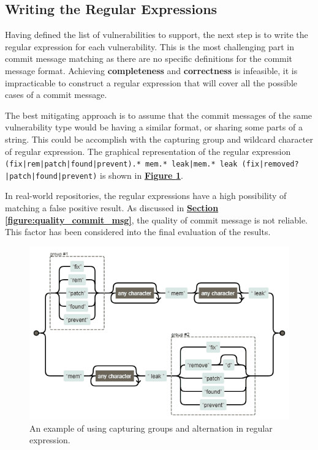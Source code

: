 \documentclass[12pt, a4paper]{report}
\begin{document}
\subsection{Writing the Regular Expressions}
Having defined the list of vulnerabilities to support, the next step is to write the regular
expression for each vulnerability. This is the most challenging part in commit message matching as
there are no specific definitions for the commit message format. Achieving \textbf{completeness} and
\textbf{correctness} is infeasible, it is impracticable to construct a regular expression that will
cover all the possible cases of a commit message.

The best mitigating approach is to assume that the commit messages of the same vulnerability type
would be having a similar format, or sharing some parts of a string. This could be accomplish with
the capturing group and wildcard character of regular expression. The graphical representation of
the regular expression \texttt{(fix|rem|patch|found|prevent).* mem.* leak|mem.* leak
(fix|removed?|patch|found|prevent)} is shown in \hyperref[figure:regex_groups]{\textbf{Figure
\ref*{figure:regex_groups}}}.

In real-world repositories, the regular expressions have a high possibility of matching a false
positive result. As discussed in \hyperref[subsec:commit_quality]{\textbf{Section
\ref*{figure:quality_commit_msg}}}, the quality of commit message is not reliable. This factor has
been considered into the final evaluation of the results.

\begin{figure}[H]
  \centering
  \includegraphics[width=.85\textwidth]{images/regex_groups.png}
  \caption{An example of using capturing groups and alternation in regular expression.}
  \label{figure:regex_groups}
\end{figure}
\end{document}
